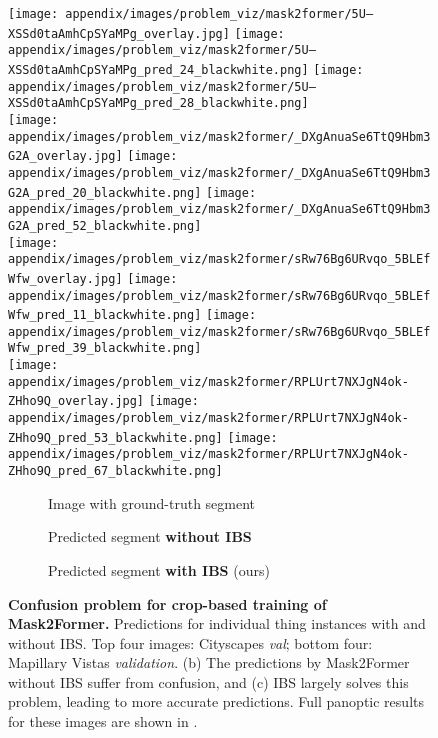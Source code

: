 \documentclass[10pt,twocolumn,letterpaper]{article}
\begin{document}
\begin{figure*}[t]
\texttt{[image: appendix/images/problem\_viz/mask2former/5U--XSSd0taAmhCpSYaMPg\_overlay.jpg]}
\texttt{[image: appendix/images/problem\_viz/mask2former/5U--XSSd0taAmhCpSYaMPg\_pred\_24\_blackwhite.png]}
\texttt{[image: appendix/images/problem\_viz/mask2former/5U--XSSd0taAmhCpSYaMPg\_pred\_28\_blackwhite.png]}\\
\texttt{[image: appendix/images/problem\_viz/mask2former/\_DXgAnuaSe6TtQ9Hbm3G2A\_overlay.jpg]}
\texttt{[image: appendix/images/problem\_viz/mask2former/\_DXgAnuaSe6TtQ9Hbm3G2A\_pred\_20\_blackwhite.png]}
\texttt{[image: appendix/images/problem\_viz/mask2former/\_DXgAnuaSe6TtQ9Hbm3G2A\_pred\_52\_blackwhite.png]}\\
\texttt{[image: appendix/images/problem\_viz/mask2former/sRw76Bg6URvqo\_5BLEfWfw\_overlay.jpg]}
\texttt{[image: appendix/images/problem\_viz/mask2former/sRw76Bg6URvqo\_5BLEfWfw\_pred\_11\_blackwhite.png]}
\texttt{[image: appendix/images/problem\_viz/mask2former/sRw76Bg6URvqo\_5BLEfWfw\_pred\_39\_blackwhite.png]}\\
\texttt{[image: appendix/images/problem\_viz/mask2former/RPLUrt7NXJgN4ok-ZHho9Q\_overlay.jpg]}
\texttt{[image: appendix/images/problem\_viz/mask2former/RPLUrt7NXJgN4ok-ZHho9Q\_pred\_53\_blackwhite.png]}
\texttt{[image: appendix/images/problem\_viz/mask2former/RPLUrt7NXJgN4ok-ZHho9Q\_pred\_67\_blackwhite.png]}\\


 \begin{subfigure}[b]{0.28\textwidth}
     \centering
     \caption{Image with ground-truth segment}
 \end{subfigure}
 \begin{subfigure}[b]{0.28\textwidth}
     \centering
     \caption{Predicted segment \textbf{without IBS}}
 \end{subfigure}
  \begin{subfigure}[b]{0.28\textwidth}
     \centering
     \caption{Predicted segment \textbf{with IBS} (ours)}
 \end{subfigure}

\vspace{-10pt}
\caption{\textbf{Confusion problem for crop-based training of Mask2Former.} Predictions for individual thing instances with and without IBS. Top four images: Cityscapes \textit{val}; bottom four: Mapillary Vistas \textit{validation}. (b) The predictions by Mask2Former without IBS suffer from confusion, and (c) IBS largely solves this problem, leading to more accurate predictions. Full panoptic results for these images are shown in .} 
\label{fig:results_m2f_problem}
\end{figure*} 
\end{document}
